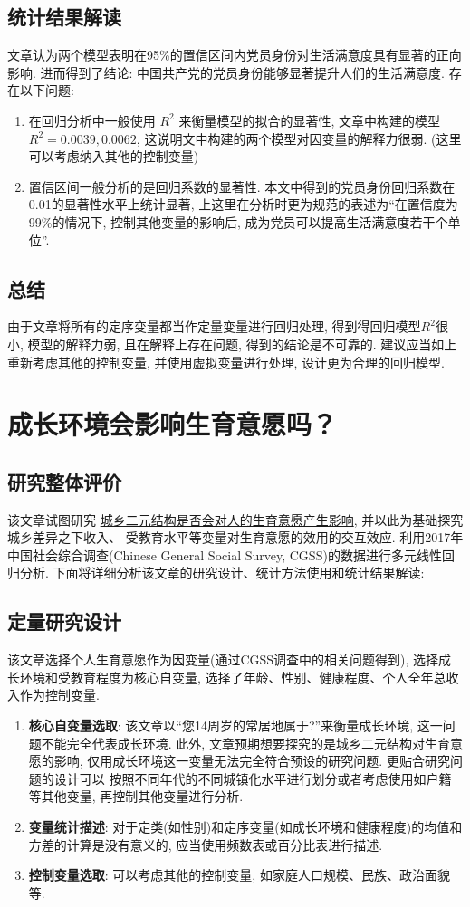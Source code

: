 \documentclass[11pt]{article}
\newcommand\1{\mathds{1}}
\begin{document}
\subsection{统计结果解读}
    文章认为两个模型表明在95\%的置信区间内党员身份对生活满意度具有显著的正向影响. 进而得到了结论: 中国共产党的党员身份能够显著提升人们的生活满意度. 存在以下问题:
    \begin{enumerate}[label=(\arabic*)]
        \item 在回归分析中一般使用 $R^2$ 来衡量模型的拟合的显著性, 文章中构建的模型 $R^2 = 0.0039, 0.0062$, 这说明文中构建的两个模型对因变量的解释力很弱. (这里可以考虑纳入其他的控制变量)
        \item 置信区间一般分析的是回归系数的显著性. 本文中得到的党员身份回归系数在0.01的显著性水平上统计显著, 上这里在分析时更为规范的表述为“在置信度为99\%的情况下, 控制其他变量的影响后, 成为党员可以提高生活满意度若干个单位”. 
    \end{enumerate}

\subsection{总结}
    由于文章将所有的定序变量都当作定量变量进行回归处理, 得到得回归模型$R^2$很小, 模型的解释力弱, 且在解释上存在问题, 得到的结论是不可靠的. 建议应当如上重新考虑其他的控制变量, 并使用虚拟变量进行处理, 设计更为合理的回归模型.

\section{成长环境会影响生育意愿吗？}
\subsection{研究整体评价}
    该文章试图研究 \underline{城乡二元结构是否会对人的生育意愿产生影响}, 并以此为基础探究 城乡差异之下收入、
    受教育水平等变量对生育意愿的效用的交互效应. 利用2017年中国社会综合调查(Chinese General Social Survey, CGSS)的数据进行多元线性回归分析. 
    下面将详细分析该文章的研究设计、统计方法使用和统计结果解读:
\subsection{定量研究设计}
    该文章选择个人生育意愿作为因变量(通过CGSS调查中的相关问题得到), 选择成长环境和受教育程度为核心自变量, 选择了年龄、性别、健康程度、个人全年总收入作为控制变量.
    \begin{enumerate}[label=(\arabic*)]
        \item \textbf{核心自变量选取}: 该文章以“您14周岁的常居地属于?”来衡量成长环境, 这一问题不能完全代表成长环境. 此外, 文章预期想要探究的是城乡二元结构对生育意愿的影响, 仅用成长环境这一变量无法完全符合预设的研究问题. 更贴合研究问题的设计可以 按照不同年代的不同城镇化水平进行划分或者考虑使用如户籍等其他变量, 再控制其他变量进行分析.
        \item \textbf{变量统计描述}: 对于定类(如性别)和定序变量(如成长环境和健康程度)的均值和方差的计算是没有意义的, 应当使用频数表或百分比表进行描述.
        \item \textbf{控制变量选取}: 可以考虑其他的控制变量, 如家庭人口规模、民族、政治面貌等. 
    \end{enumerate}
\end{document}
